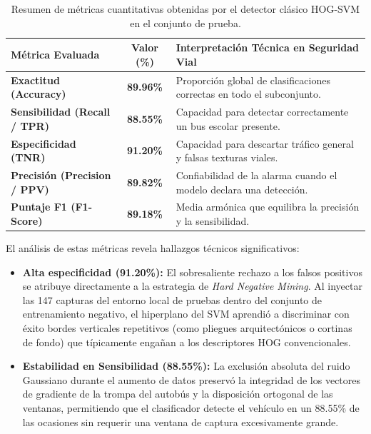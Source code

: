 \documentclass[12pt]{article}
\begin{document}
\begin{table}[H]
    \centering
    \small
    \begin{tabularx}{\linewidth}{|>{\raggedright\arraybackslash}p{4.2cm}|c|>{\raggedright\arraybackslash}X|}
        \hline
        \textbf{Métrica Evaluada} & \textbf{Valor (\%)} & \textbf{Interpretación Técnica en Seguridad Vial} \\
        \hline
        \textbf{Exactitud (Accuracy)} & \textbf{89.96\%} & Proporción global de clasificaciones correctas en todo el subconjunto. \\
        \hline
        \textbf{Sensibilidad (Recall / TPR)} & \textbf{88.55\%} & Capacidad para detectar correctamente un bus escolar presente. \\
        \hline
        \textbf{Especificidad (TNR)} & \textbf{91.20\%} & Capacidad para descartar tráfico general y falsas texturas viales. \\
        \hline
        \textbf{Precisión (Precision / PPV)} & \textbf{89.82\%} & Confiabilidad de la alarma cuando el modelo declara una detección. \\
        \hline
        \textbf{Puntaje F1 (F1-Score)} & \textbf{89.18\%} & Media armónica que equilibra la precisión y la sensibilidad. \\
        \hline
    \end{tabularx}
    \caption{Resumen de métricas cuantitativas obtenidas por el detector clásico HOG-SVM en el conjunto de prueba.}
    \label{tab:metricas_hog}
\end{table}

El análisis de estas métricas revela hallazgos técnicos significativos:
\begin{itemize}
    \item \textbf{Alta especificidad (91.20\%):} El sobresaliente rechazo a los falsos positivos se atribuye directamente a la estrategia de \emph{Hard Negative Mining}. Al inyectar las 147 capturas del entorno local de pruebas dentro del conjunto de entrenamiento negativo, el hiperplano del SVM aprendió a discriminar con éxito bordes verticales repetitivos (como pliegues arquitectónicos o cortinas de fondo) que típicamente engañan a los descriptores HOG convencionales.
    \item \textbf{Estabilidad en Sensibilidad (88.55\%):} La exclusión absoluta del ruido Gaussiano durante el aumento de datos preservó la integridad de los vectores de gradiente de la trompa del autobús y la disposición ortogonal de las ventanas, permitiendo que el clasificador detecte el vehículo en un 88.55\% de las ocasiones sin requerir una ventana de captura excesivamente grande.
\end{itemize}
\end{document}

